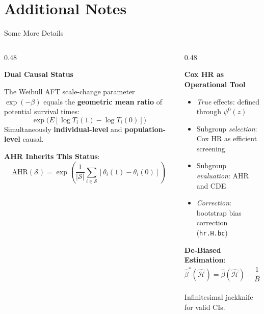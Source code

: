 \documentclass[
  ignorenonframetext,
  aspectratio=169]{beamer}
\begin{document}
\section{Additional Notes}\label{additional-notes}

\begin{frame}[shrink]{Some More Details}
\label{some-more-details}
\begin{columns}[T]
\begin{column}{0.48\textwidth}

\textbf{Dual Causal Status}

The Weibull AFT scale-change parameter $\exp(-\beta)$ equals the \textbf{geometric mean ratio} of potential survival times:
$$\exp\!\bigl(E[\log T_{i}(1) - \log T_{i}(0)]\bigr)$$
Simultaneously \textbf{individual-level} and \textbf{population-level} causal.

\medskip

\textbf{AHR Inherits This Status}:
$$\text{AHR}(\mathcal{S}) = \exp\!\left(\frac{1}{|\mathcal{S}|}\sum_{i \in \mathcal{S}} [\theta_{i}(1) - \theta_{i}(0)]\right)$$

\end{column}
\begin{column}{0.48\textwidth}

\textbf{Cox HR as Operational Tool}

\begin{itemize}
\item \emph{True} effects: defined through $\psi^{0}(z)$
\item Subgroup \emph{selection}: Cox HR as efficient screening
\item Subgroup \emph{evaluation}: AHR and CDE
\item \emph{Correction}: bootstrap bias correction (\texttt{hr.H.bc})
\end{itemize}

\medskip

\textbf{De-Biased Estimation}:
$$\hat{\beta}^{*}(\hat{\mathcal{H}}) = \hat{\beta}(\hat{\mathcal{H}}) - \frac{1}{B}\sum_{b=1}^{B}\bigl[\eta^{*}_{b}(\hat{\mathcal{H}}^{*}_{b}) + \eta^{*}_{b}(\hat{\mathcal{H}})\bigr]$$

Infinitesimal jackknife for valid CIs.

\end{column}
\end{columns}
\end{frame}
\end{document}
